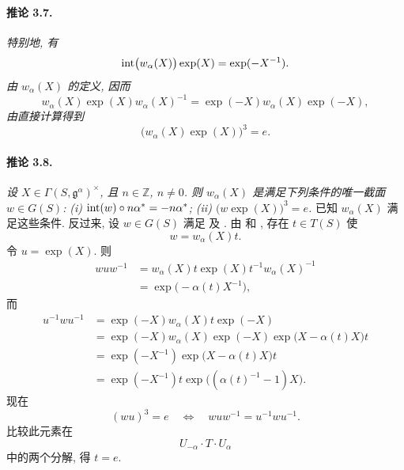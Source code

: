 \paragraph{\textbf{推论 3.7.}}
\emph{特别地, 有}
\[
  \operatorname{int}\bigl(w_\alpha(X)\bigr)\exp(X)=\exp(-X^{-1}).
\]
\emph{由 \(w_\alpha(X)\) 的定义, 因而}
\[
  w_\alpha(X)\exp(X)w_\alpha(X)^{-1}
    =\exp(-X)w_\alpha(X)\exp(-X),
\]
\emph{由直接计算得到}
\[
  \bigl(w_\alpha(X)\exp(X)\bigr)^3=e.
\]

\paragraph{\textbf{推论 3.8.}}
\emph{设 \(X\in\Gamma(S,\mathfrak g^\alpha)^\times\), 且 \(n\in\mathbb Z\), \(n\ne0\). 则 \(w_\alpha(X)\) 是满足下列条件的唯一截面 \(w\in G(S)\):}
\smallskip
\noindent\emph{\textup{(i)} \(\operatorname{int}(w)\circ n\alpha^\ast=-n\alpha^\ast\);}
\smallskip
\noindent\emph{\textup{(ii)} \(\bigl(w\exp(X)\bigr)^3=e\).}
\smallskip
已知 \(w_\alpha(X)\) 满足这些条件. 反过来, 设 \(w\in G(S)\) 满足 \textup{} 及 \textup{}. 由  和  \textup{}, 存在 \(t\in T(S)\) 使
\[
  w=w_\alpha(X)t.
\]
令 \(u=\exp(X)\). 则
\[
\begin{aligned}
  wuw^{-1}
    &=w_\alpha(X)t\exp(X)t^{-1}w_\alpha(X)^{-1}\\
    &=\exp\bigl(-\alpha(t)X^{-1}\bigr),
\end{aligned}
\]
而
\[
\begin{aligned}
  u^{-1}wu^{-1}
    &={}\exp(-X)w_\alpha(X)t\exp(-X)\\
    &={}\exp(-X)w_\alpha(X)\exp(-X)
       \exp\bigl(X-\alpha(t)X\bigr)t\\
    &={}\exp(-X^{-1})\exp\bigl(X-\alpha(t)X\bigr)t\\
    &={}\exp(-X^{-1})t
       \exp\bigl((\alpha(t)^{-1}-1)X\bigr).
\end{aligned}
\]
现在
\[
  (wu)^3=e
  \quad\Longleftrightarrow\quad
  wuw^{-1}=u^{-1}wu^{-1}.
\]
比较此元素在
\[
  U_{-\alpha}\cdot T\cdot U_\alpha
\]
中的两个分解, 得 \(t=e\).

